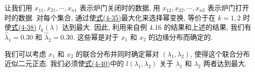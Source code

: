 让我们用 $x_{11}, x_{21}, \cdots, x_{n1}$ 表示炉门关闭时的数据, 用 $x_{12}, x_{22}, \cdots, x_{n2}$ 表示炉门打开时的数据. 对每个集合, 通过使\hyperref[eq:4-35]{式(4-35)}最大化来选择幂变换, 等价于在 $k = 1, 2$ 时使\hyperref[eq:4-38]{式(4-38)} $l_k(\lambda)$ 达到最大. 因此, 利用来自例 4.16 的结果和上述的结果, 我们有 $\hat{\lambda}_1 = 0.30$ 和 $\hat{\lambda}_2 = 0.30$. 这些幂是对于 $x_1$ 和 $x_2$ 的边缘分布而确定的.

我们可以考虑 $x_1$ 和 $x_2$ 的联合分布并同时确定幂对 $(\lambda_1, \lambda_2)$, 使得这个联合分布近似二元正态. 我们必须使\hyperref[eq:4-40]{式(4-40)}中的 $l(\lambda_1, \lambda_2)$ 关于 $\lambda_1$ 和 $\lambda_2$ 两者达到最大.
